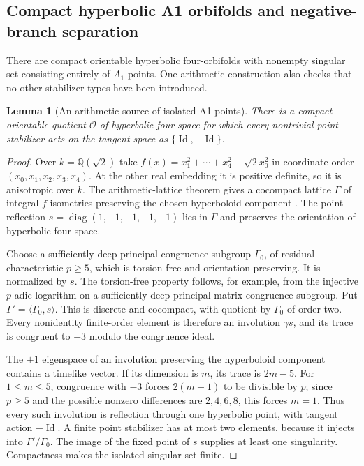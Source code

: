 \documentclass[a4paper,11pt]{article}
\numberwithin{equation}{section}
\newtheorem{lemma}[theorem]{Lemma}
\theoremstyle{definition}
\newcommand{\Id}{\operatorname{Id}}
\begin{document}
\subsection{Compact hyperbolic A1 orbifolds and negative-branch separation}\label{sec:negative-GH-separation}
There are compact orientable hyperbolic four-orbifolds with nonempty singular set consisting entirely of $A_1$ points. One arithmetic construction also checks that no other stabilizer types have been introduced.

\begin{lemma}[An arithmetic source of isolated A1 points]\label{lem:hyperbolic-A1}
There is a compact orientable quotient $\mathcal O$ of hyperbolic four-space for which every nontrivial point stabilizer acts on the tangent space as $\{\Id,-\Id\}$.
\end{lemma}
\begin{proof}
Over $k=\mathbb Q(\sqrt2)$ take
$f(x)=x_1^2+\cdots+x_4^2-\sqrt2 x_0^2$ in coordinate order $(x_0,x_1,x_2,x_3,x_4)$. At the other real embedding it is positive definite, so it is anisotropic over $k$. The arithmetic-lattice theorem gives a cocompact lattice $\Gamma$ of integral $f$-isometries preserving the chosen hyperboloid component \cite{BorelHarishChandra}. The point reflection
$s=\operatorname{diag}(1,-1,-1,-1,-1)$ lies in $\Gamma$ and preserves the orientation of hyperbolic four-space.

Choose a sufficiently deep principal congruence subgroup $\Gamma_0$, of residual characteristic $p\ge5$, which is torsion-free and orientation-preserving. It is normalized by $s$. The torsion-free property follows, for example, from the injective $p$-adic logarithm on a sufficiently deep principal matrix congruence subgroup. Put $\Gamma'=\langle\Gamma_0,s\rangle$. This is discrete and cocompact, with quotient by $\Gamma_0$ of order two. Every nonidentity finite-order element is therefore an involution $\gamma s$, and its trace is congruent to $-3$ modulo the congruence ideal.

The $+1$ eigenspace of an involution preserving the hyperboloid component contains a timelike vector. If its dimension is $m$, its trace is $2m-5$. For $1\le m\le5$, congruence with $-3$ forces $2(m-1)$ to be divisible by $p$; since $p\ge5$ and the possible nonzero differences are $2,4,6,8$, this forces $m=1$. Thus every such involution is reflection through one hyperbolic point, with tangent action $-\Id$. A finite point stabilizer has at most two elements, because it injects into $\Gamma'/\Gamma_0$. The image of the fixed point of $s$ supplies at least one singularity. Compactness makes the isolated singular set finite.
\end{proof}
\end{document}
